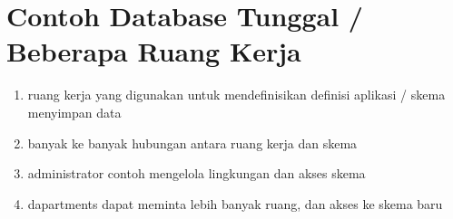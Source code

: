 \section{Contoh Database Tunggal / Beberapa Ruang Kerja}
\begin{enumerate}
    \item ruang kerja yang digunakan untuk mendefinisikan definisi aplikasi / skema menyimpan data
  \item banyak ke banyak hubungan antara ruang kerja dan skema
  \item administrator contoh mengelola lingkungan dan akses skema
  \item dapartments dapat meminta lebih banyak ruang, dan akses ke skema baru
 
\end{enumerate}